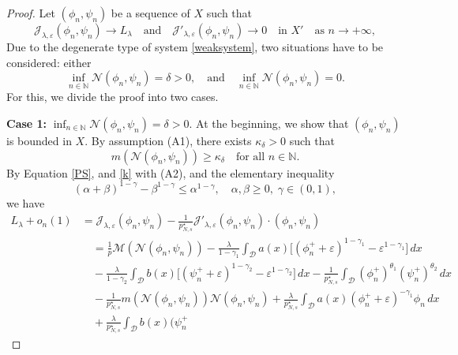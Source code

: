 \documentclass[10pt,a4paper]{amsart}
\numberwithin{equation}{section}
\begin{document}
\begin{proof}
Let $(\phi_n,\psi_n)$ be a sequence of $X$ such that
\begin{equation}\label{PS}
\mathcal{J}_{\lambda,\varepsilon}(\phi_n,\psi_n)\to L_\lambda\quad\text{and}\quad
\mathcal{J}'_{\lambda,\varepsilon}(\phi_n,\psi_n)\to 0\quad\text{in } X'\quad\text{as } 
n\to +\infty,
\end{equation}
Due to the degenerate type of system \eqref{weaksystem}, two situations have to be 
considered: either
$$
\inf_{n\in \mathbb{N}} \mathcal{N}(\phi_n,\psi_n)=\delta>0,\quad
 \text{and}\quad
 \inf_{n\in \mathbb{N}} \mathcal{N}(\phi_n,\psi_n)=0.
$$
For this, we divide the proof into two cases.
\smallskip

\noindent\textbf{Case 1:} $\inf_{n\in \mathbb{N}} \mathcal{N}(\phi_n,\psi_n)=\delta>0$. 
At the beginning, we show that $(\phi_n,\psi_n)$ is bounded in $X$. By assumption 
(A1), there exists $\kappa_\delta>0$ such that
\begin{equation}\label{k}
m(\mathcal{N}(\phi_n,\psi_n))\geq \kappa_\delta\quad \text{for all } n\in\mathbb{N}.
\end{equation}
By Equation \eqref{PS}, and \eqref{k} with (A2), and the elementary inequality
\begin{equation}\label{elementary}
(\alpha+\beta)^{1-\gamma}-\beta^{1-\gamma}\leq \alpha^{1-\gamma},\quad
 \alpha,\beta\geq 0,\; \gamma\in (0,1),
\end{equation}
we have
\begin{equation} \label{K000}
\begin{aligned}
L_\lambda+o_n(1)
&=\mathcal{J}_{\lambda,\varepsilon}(\phi_n,\psi_n)-\frac{1}{p^\star_{N,s}}
 \mathcal{J}'_{\lambda,\varepsilon}(\phi_n,\psi_n)\cdot (\phi_n,\psi_n) \\
&\quad =\frac{1}{p}\mathscr{M}(\mathcal{N}(\phi_n,\psi_n))-\frac{\lambda}{1-\gamma_1}
 \int_\mathcal{D} a(x)\Big[(\phi_n^++\varepsilon)^{1-\gamma_1}
 -\varepsilon^{1-\gamma_1}\Big]\,dx \\
&\quad -\frac{\lambda}{1-\gamma_2}\int_\mathcal{D} b(x)\Big[(\psi_n^+
 +\varepsilon)^{1-\gamma_2}-\varepsilon^{1-\gamma_2}\Big]\,dx
 -\frac{1}{p^\star_{N,s}}\int_\mathcal{D}  (\phi_n^+)^{\theta_1}(\psi_n^+)^{\theta_2}\,dx
 \\
&\quad -\frac{1}{p^\star_{N,s}}m(\mathcal{N}(\phi_n,\psi_n))\mathcal{N}(\phi_n,\psi_n)
 +\frac{\lambda}{p^\star_{N,s}}\int_\mathcal{D} a(x)(\phi_n^++\varepsilon)^{-\gamma_1}
 \phi_n\,dx  \\
&\quad +\frac{\lambda}{p^\star_{N,s}}\int_\mathcal{D}b(x)(\psi_n^+

\end{aligned}
\end{equation}
\end{proof}
\end{document}

